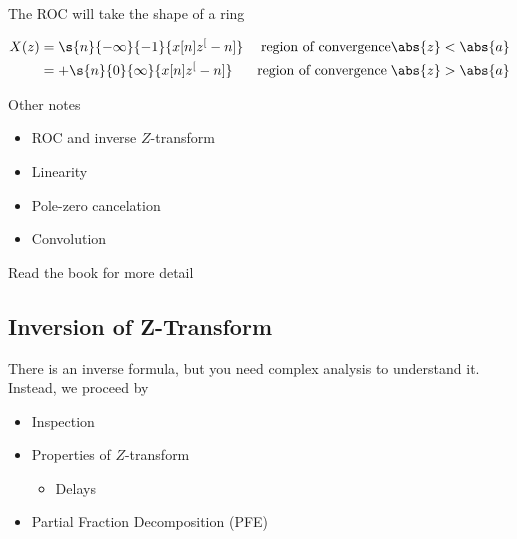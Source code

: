 \documentclass{report}
\begin{document}
The ROC will take the shape of a ring

\begin{align*}
    X(z)
    &= \s{n}{-\infty}{-1}{x[n]z^[-n]} & \; \text{region of convergence} \abs{z} < \abs{a} \\
    &= + \s{n}{0}{\infty}{x[n]z^[-n]} & \text{region of convergence} \; \abs{z} > \abs{a} \\
\end{align*}

Other notes

\begin{itemize}
    \item ROC and inverse $Z$-transform
    \item Linearity
    \item Pole-zero cancelation
    \item Convolution
\end{itemize}
Read the book for more detail

\begin{example}
\end{example}

\subsection{Inversion of Z-Transform}
There is an inverse formula, but you need complex analysis to understand it. Instead, we proceed by

\begin{itemize}
    \item Inspection
    \item Properties of $Z$-transform
    \begin{itemize}
        \item Delays
    \end{itemize}
    \item Partial Fraction Decomposition (PFE)
\end{itemize}
\end{document}
